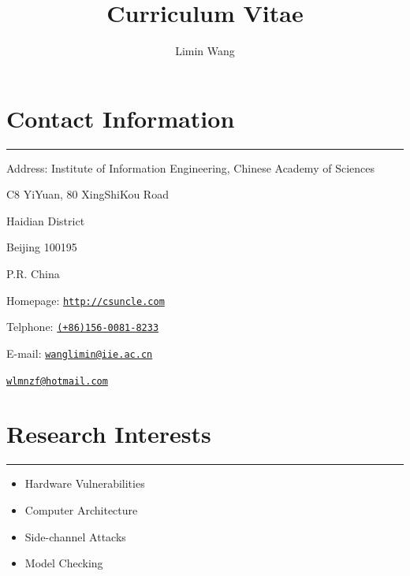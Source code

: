 \documentclass[11pt]{article}
\begin{document}
\title{%
{\sc Curriculum Vitae}}

\author{Limin Wang}

\date{\vspace{-.2cm}}



\maketitle

\section*{Contact Information}
\vspace{-0.6cm}
\rule[0.1pt]{\textwidth}{1pt}
\vspace{0cm}
\hspace{.52cm}Address: Institute of Information Engineering, Chinese Academy of Sciences

\hspace{1.54cm}C8 YiYuan, 80 XingShiKou Road

\hspace{1.54cm}Haidian District

\hspace{1.54cm}Beijing 100195

\hspace{1.54cm}P.R. China


Homepage: \href{http://csuncle.com/about/}{\tt http://csuncle.com}

\vspace{.2cm}
Telphone: \href{(+86)156-0081-8233}{\tt (+86)156-0081-8233}
\vspace{.2cm}

E-mail: \href{wanglimin@iie.ac.cn}{\tt wanglimin@iie.ac.cn}

\hspace{1.40cm}\href{wlmnzf@hotmail.com}{\tt wlmnzf@hotmail.com}



\section*{Research Interests}
\vspace{-0.6cm}
\rule[0.1pt]{\textwidth}{1pt}
\begin{itemize}
	\item Hardware Vulnerabilities
	\item Computer Architecture
	\item Side-channel Attacks
	\item Model Checking
\end{itemize}
\end{document}
